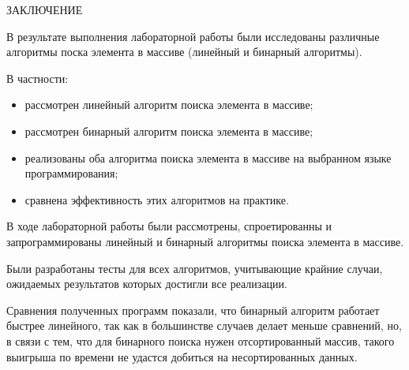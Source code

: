 \begin{center}
    \MakeUppercase{\large Заключение}
\end{center}

В результате выполнения лабораторной работы были исследованы различные алгоритмы поска элемента в массиве (линейный и бинарный алгоритмы).

\vspace{0.25cm}
В частности:

\begin{itemize}

\item рассмотрен линейный алгоритм поиска элемента в массиве;

\item рассмотрен бинарный алгоритм поиска элемента в массиве;

\item реализованы оба алгоритма поиска элемента в массиве на выбранном языке программирования;

\item сравнена эффективность этих алгоритмов на практике.

\end{itemize}

В ходе лабораторной работы были рассмотрены, спроетированны и запрограммированы линейный и бинарный алгоритмы поиска элемента в массиве.

Были разработаны тесты для всех алгоритмов, учитывающие крайние случаи, ожидаемых результатов которых достигли все реализации.

Сравнения полученных программ показали, что бинарный алгоритм работает быстрее линейного, так как в большинстве случаев делает меньше сравнений, но, в связи с тем, что для бинарного поиска нужен отсортированный массив, такого выигрыша по времени не удастся добиться на несортированных данных.

\newpage